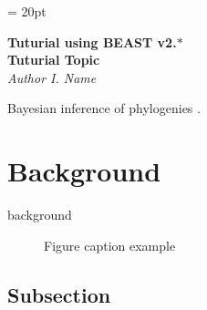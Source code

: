 \documentclass[11pt]{article}
\begin{document}
\renewcommand{\headrulewidth}{0.5pt}
\headsep = 20pt
\lhead{ }

\thispagestyle{plain}

\begin{center}
\textbf{\LARGE Tuturial using BEAST v2.$*$}\\\vspace{2mm}
\textbf{\textcolor{mycol}{\Large Tuturial Topic}}\\
\vspace{4mm}
{\Large {\em Author I. Name}}
\end{center}


Bayesian inference of phylogenies \citet{drummond06}.

\bigskip
\section{Background}

background

\begin{figure}[h]
\centering
{}
\caption{\small Figure caption example}
\label{fig:example}
\end{figure}



\bigskip
\subsection{Subsection} 
\end{document}
